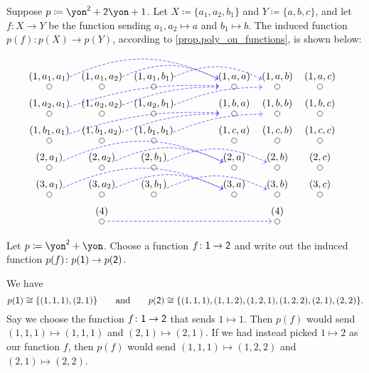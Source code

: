 \documentclass[Book-Poly]{subfiles}
\begin{document}
\begin{example}
    Suppose $p\coloneqq\yon^\2+\2\yon+1$. Let $X\coloneqq\{a_1,a_2,b_1\}$ and $Y\coloneqq\{a,b,c\}$, and let $f\colon X\to Y$ be the function sending $a_1,a_2\mapsto a$ and $b_1\mapsto b$. The induced function $p(f)\colon p(X)\to p(Y)$, according to \cref{prop.poly_on_functions}, is shown below:
    \[
    \begin{tikzcd}[row sep=2pt, column sep=3pt, shorten <=-5pt, shorten >=-5pt, dashed]
        \LMO{(1,a_1,a_1)}\ar[rrrr, blue, bend left=25pt]&\LMO{(1,a_1,a_2)}\ar[rrr, blue, bend left=25pt]&\LMO{(1,a_1,b_1)}\ar[rrr, blue, bend left=25pt]&[30pt]&
        \LMO{(1,a,a)}&\LMO{(1,a,b)}&\LMO{(1,a,c)}&&
        \\
        \LMO{(1,a_2,a_1)}\ar[rrrru, blue, bend left=10pt]&\LMO{(1,a_2,a_2)}\ar[rrru, blue, bend left=10pt]&\LMO{(1,a_2,b_1)}\ar[rrru, blue, bend left=10pt]&&
        \LMO{(1,b,a)}&\LMO{(1,b,b)}&\LMO{(1,b,c)}&&
        \\
        \LMO{(1,b_1,a_1)}\ar[rrrru, blue, bend left=10pt]&\LMO{(1,b_1,a_2)}\ar[rrru, blue, bend left=10pt]&\LMO{(1,b_1,b_1)}\ar[rrru, blue, bend left=10pt]&&
        \LMO{(1,c,a)}&\LMO{(1,c,b)}&\LMO{(1,c,c)}&&
        \\
        \LMO{(2,a_1)}\ar[rrrr, blue, bend left=25pt]&\LMO{(2,a_2)}\ar[rrr, blue, bend left=25pt]&\LMO{(2,b_1)}\ar[rrr, blue, bend left=25pt]&&
        \LMO{(2,a)}&\LMO{(2,b)}&\LMO{(2,c)}&&
        \\
        \LMO{(3,a_1)}\ar[rrrr, blue, bend left=25pt]&\LMO{(3,a_2)}\ar[rrr, blue, bend left=25pt]&\LMO{(3,b_1)}\ar[rrr, blue, bend left=25pt]&&
        \LMO{(3,a)}&\LMO{(3,b)}&\LMO{(3,c)}&&
        \\&
        \LMO{(4)}\ar[rrrr, blue]&&&&\LMO{(4)}
    \end{tikzcd}
    \]
\end{example}

\begin{exercise}
    Let $p\coloneqq\yon^\2+\yon$. Choose a function $f\colon\textsf{1}\to\textsf{2}$ and write out the induced function $p(f)\colon p(\textsf{1})\to p(\textsf{2})$.
    \begin{solution}
        We have
        \[
        p(\textsf{1}) \cong \{(1, 1, 1), (2, 1)\} \qquad\text{and}\qquad p(\textsf{2}) \cong \{(1, 1, 1), (1, 1, 2), (1, 2, 1), (1, 2, 2), (2, 1), (2, 2)\}.
        \]
        Say we choose the function $f\colon\textsf{1}\to\textsf{2}$ that sends $1 \mapsto 1$.
        Then $p(f)$ would send $(1, 1, 1) \mapsto (1, 1, 1)$ and $(2, 1) \mapsto (2, 1)$.
        If we had instead picked $1 \mapsto 2$ as our function $f$, then $p(f)$ would send $(1, 1, 1) \mapsto (1, 2, 2)$ and $(2, 1) \mapsto (2, 2)$.
    \end{solution}
\end{exercise}
\end{document}
